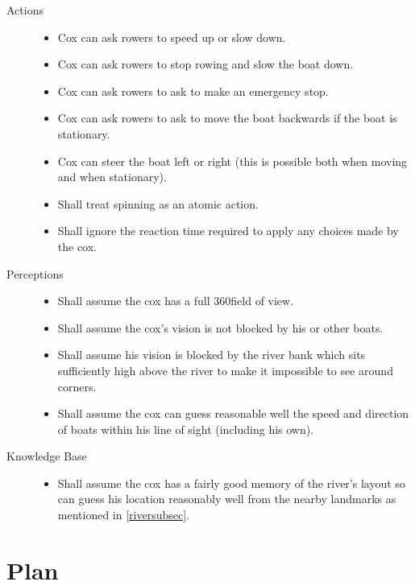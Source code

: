   \begin{description}
    \item[Actions]
      \begin{itemize}
        \item Cox can ask rowers to speed up or slow down.
        \item Cox can ask rowers to stop rowing and slow the boat down.
        \item Cox can ask rowers to ask to make an emergency stop.
        \item Cox can ask rowers to ask to move the boat backwards if the boat is stationary.
        \item Cox can steer the boat left or right (this is possible both when moving and when stationary).
        \item Shall treat spinning as an atomic action.
        \item Shall ignore the reaction time required to apply any choices
          made by the cox.
        \end{itemize}
    \item[Perceptions]
      \begin{itemize}
        \item Shall assume the cox has a full 360\textdegree field of
          view.
        \item Shall assume the cox's vision is not blocked by his or other boats.
        \item Shall assume his
        vision is blocked by the river bank which sits sufficiently high
        above the river to make it impossible to see around corners.
        \item Shall assume the cox can guess reasonable well the speed and
        direction of boats within his line of sight (including his own).
        \end{itemize}
    \item[Knowledge Base]
      \begin{itemize}
        \item Shall assume the cox has a fairly good memory of the river's
          layout so can guess his location reasonably well from the nearby
          landmarks as mentioned in \ref{riversubsec}.
      \end{itemize}
  \end{description}

\section{Plan}

